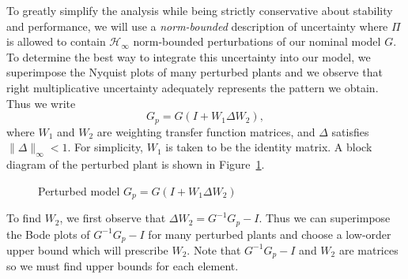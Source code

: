 \documentclass[12pt,lot, lof]{puthesis}
\begin{document}
To greatly simplify the analysis while being strictly conservative about stability and performance, we will use a \emph{norm-bounded} description of uncertainty where $\Pi$ is allowed to contain $\mathcal{H}_\infty$ norm-bounded perturbations of our nominal model $G$.
To determine the best way to integrate this uncertainty into our model, we superimpose the Nyquist plots of many perturbed plants and we observe that right multiplicative uncertainty adequately represents the pattern we obtain.
Thus we write
\begin{equation} \label{eq:multiplicative}
	G_p = G (I + W_1 \Delta W_2),
\end{equation}
where $W_1$ and $W_2$ are weighting transfer function matrices, and $\Delta$ satisfies $\|\Delta\|_\infty < 1$.
For simplicity, $W_1$ is taken to be the identity matrix.
A block diagram of the perturbed plant is shown in Figure~\ref{fig:multiplicative}.

\begin{figure}[htbp]
	\centering
	\caption{Perturbed model $G_p = G (I + W_1 \Delta W_2)$}
	\label{fig:multiplicative}
\end{figure}

To find $W_2$, we first observe that $\Delta W_2 = G^{-1}{G_p} - I$.
Thus we can superimpose the Bode plots of $G^{-1}{G_p} - I$ for many perturbed plants and choose a low-order upper bound which will prescribe $W_2$.
Note that $G^{-1}{G_p} - I$ and $W_2$ are matrices so we must find upper bounds for each element.
\end{document}
